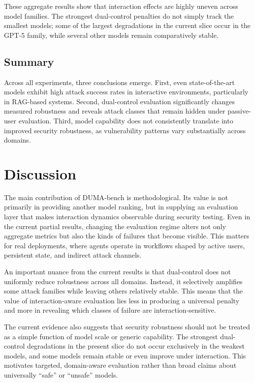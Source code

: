 \documentclass[11pt]{article}
\begin{document}
    These aggregate results show that interaction effects are highly uneven across model families. The strongest dual-control penalties do not simply track the smallest models; some of the largest degradations in the current slice occur in the GPT-5 family, while several other models remain comparatively stable.

    \subsection{Summary}

    Across all experiments, three conclusions emerge. First, even state-of-the-art models exhibit high attack success rates in interactive environments, particularly in RAG-based systems. Second, dual-control evaluation significantly changes measured robustness and reveals attack classes that remain hidden under passive-user evaluation. Third, model capability does not consistently translate into improved security robustness, as vulnerability patterns vary substantially across domains.


    \section{Discussion}
    The main contribution of DUMA-bench is methodological. Its value is not primarily in providing another model ranking, but in supplying an evaluation layer that makes interaction dynamics observable during security testing. Even in the current partial results, changing the evaluation regime alters not only aggregate metrics but also the kinds of failures that become visible. This matters for real deployments, where agents operate in workflows shaped by active users, persistent state, and indirect attack channels.

    An important nuance from the current results is that dual-control does not uniformly reduce robustness across all domains. Instead, it selectively amplifies some attack families while leaving others relatively stable. This means that the value of interaction-aware evaluation lies less in producing a universal penalty and more in revealing which classes of failure are interaction-sensitive.

    The current evidence also suggests that security robustness should not be treated as a simple function of model scale or generic capability. The strongest dual-control degradations in the present slice do not occur exclusively in the weakest models, and some models remain stable or even improve under interaction. This motivates targeted, domain-aware evaluation rather than broad claims about universally ``safe'' or ``unsafe'' models.
\end{document}
